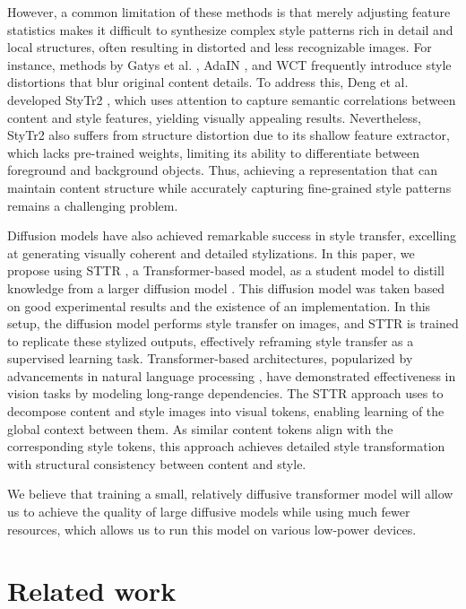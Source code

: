 \documentclass{article}
\begin{document}
    However, a common limitation of these methods is that merely adjusting feature statistics makes it difficult to synthesize complex style patterns rich in detail and local structures, often resulting in distorted and less recognizable images. For instance, methods by Gatys et al. \cite{method 10}, AdaIN \cite{method 14}, and WCT \cite{method 15} frequently introduce style distortions that blur original content details. To address this, Deng et al. developed StyTr2 \cite{method 18}, which uses attention to capture semantic correlations between content and style features, yielding visually appealing results. Nevertheless, StyTr2 also suffers from structure distortion due to its shallow feature extractor, which lacks pre-trained weights, limiting its ability to differentiate between foreground and background objects. Thus, achieving a representation that can maintain content structure while accurately capturing fine-grained style patterns remains a challenging problem.
    
    Diffusion models \cite{method 1, method 2, method 3, method 4} have also achieved remarkable success in style transfer, excelling at generating visually coherent and detailed stylizations. In this paper, we propose using STTR \cite{method 5}, a Transformer-based model, as a student model to distill knowledge from a larger diffusion model \cite{method 4}. This diffusion model was taken based on good experimental results and the existence of an implementation. In this setup, the diffusion model \cite{method 4} performs style transfer on images, and STTR \cite{method 5} is trained to replicate these stylized outputs, effectively reframing style transfer as a supervised learning task. Transformer-based architectures, popularized by advancements in natural language processing \cite{method 19}, have demonstrated effectiveness in vision tasks by modeling long-range dependencies. The STTR \cite{method 5} approach uses to decompose content and style images into visual tokens, enabling learning of the global context between them. As similar content tokens align with the corresponding style tokens, this approach achieves detailed style transformation with structural consistency between content and style.

    We believe that training a small, relatively diffusive transformer model will allow us to achieve the quality of large diffusive models while using much fewer resources, which allows us to run this model on various low-power devices.

\section{Related work}
\label{sec:headings}
\end{document}
